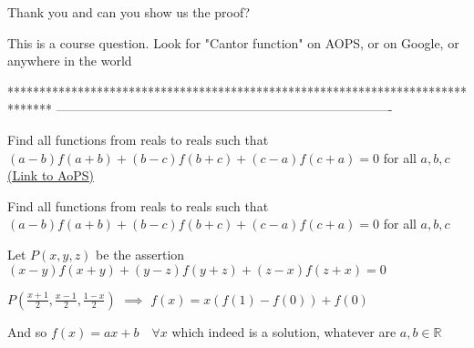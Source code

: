 


\begin{solution}
	\begin{tcolorbox}Thank you and can you show us the proof?\end{tcolorbox}
This is a course question. Look for "Cantor function" on AOPS, or on Google, or anywhere in the world



\end{solution}
*******************************************************************************
-------------------------------------------------------------------------------

\begin{problem}
	Find all functions from reals to reals such that $(a-b)f(a+b)+(b-c)f(b+c)+(c-a)f(c+a)=0$ for all $a,b,c$
	\flushright \href{https://artofproblemsolving.com/community/c6h1636428}{(Link to AoPS)}
\end{problem}



\begin{solution}
	\begin{tcolorbox}Find all functions from reals to reals such that $(a-b)f(a+b)+(b-c)f(b+c)+(c-a)f(c+a)=0$ for all $a,b,c$\end{tcolorbox}
Let $P(x,y,z)$ be the assertion $(x-y)f(x+y)+(y-z)f(y+z)+(z-x)f(z+x)=0$

$P(\frac{x+1}2,\frac{x-1}2,\frac{1-x}2)$ $\implies$ $f(x)=x(f(1)-f(0))+f(0)$

And so $\boxed{f(x)=ax+b\quad\forall x}$
which indeed is a solution, whatever are $a,b\in\mathbb R$


\end{solution}



